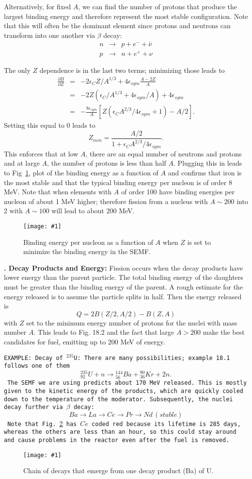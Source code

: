 \documentclass[11pt]{book}
\def\be{\begin{equation}}
\def\ee{\end{equation}}
\def\bea{\begin{eqnarray}}
\def\eea{\end{eqnarray}}
\newcommand{\vs}{\nonumber\\}
\newcommand{\sfig}[2]{
\texttt{[image: \#1]}
        }
\newcommand{\Sfig}[2]{
   \begin{figure}[thbp]
   \begin{center}
    \sfig{../Figures/#1.pdf}{0.7\columnwidth}
    \caption{{\small #2}}
    \label{fig:#1}
     \end{center}
   \end{figure}
}
\newcommand{\Spng}[2]{
   \begin{figure}[thbp]
   \begin{center}
    \sfig{../Figures/#1.png}{0.7\columnwidth}
    \caption{{\small #2}}
    \label{fig:#1}
     \end{center}
   \end{figure}
}
\newcommand{\rf}[1]{\ref{fig:#1}}
\newcommand\example[1]{{\tt EXAMPLE: #1}}
\newcommand\lecture[1]{\newpage
\addtocounter{lectureno}{1}
\setcounter{secno}{0}
\begin{center}
 {\bf Lecture \arabic{lectureno}: #1}
\end{center}
}
\newcounter{lectureno}
\newcounter{secno}
\newcommand\lsection[1]{
\addtocounter{secno}{1}
{\bf \arabic{lectureno}.\alph{secno} #1:}}
\begin{document}
Alternatively, for fixed $A$, we can find the number of protons that produce the largest binding energy and therefore represent the most stable configuration. Note that this will often be the dominant element since protons and neutrons can transform into one another via $\beta$ decay:
\bea
n &\rightarrow &p + e^- +\bar\nu
\vs
p &\rightarrow& n+ e^+ + \nu
\eea

The only $Z$ dependence is in the last two terms; minimizing those leads to
\bea
\frac{\partial B}{\partial Z}&=& -2\epsilon_C Z/A^{1/3} + 4\epsilon_{sym}\frac{A-2Z}{A}
\vs
&=&
-2Z\left( \epsilon_C/A^{1/3} + 4\epsilon_{sym}/A\right) + 4\epsilon_{sym}\vs
&=& -\frac{8\epsilon_{sym}}{A} \left[ Z\left( \epsilon_CA^{2/3}/4\epsilon_{sym} + 1\right) - A/2 \right].
\eea
Setting this equal to 0 leads to
\be
Z_{min} = \frac{A/2}{1+  \epsilon_CA^{2/3}/4\epsilon_{sym} }.\ee
This enforces that at low $A$, there are an equal number of neutrons and protons and at large $A$, the number of protons is less than half $A$. Plugging this in leads to Fig~\rf{bea}, plot of the binding energy as a function of $A$ and confirms that iron is the most stable and that the typical binding energy per nucleon is of order 8 MeV. Note that when elements with $A$ of order 100 have binding energies per nucleon of about 1 MeV higher; therefore fission from a nucleus with $A\sim200$ into 2 with $A\sim 100$ will lead to about 200 MeV.
\Spng{bea}{Binding energy per nucleon as a function of $A$ when $Z$ is set to minimize the binding energy in the SEMF.}




\lsection{Decay Products and Energy}
Fission occurs when the decay products have lower energy than the parent particle. The total binding energy of the daughters must be greater than the binding energy of the parent. A rough estimate for the energy released is to assume the particle splits in half. Then the energy released is
\be
Q = 2B(Z/2,A/2) - B(Z,A)
\ee
with $Z$ set to the minimum energy number of protons for the nuclei with mass number $A$. This leads to Fig. 18.2 and the fact that large $A>200$ make the best candidates for fuel, emitting up to 200 MeV of energy.

\example{Decay of $^{235}$U: There are many possibilities; example 18.1 follows one of them
\be
{}^{235}_{92}U + n\rightarrow {}^{144}_{56}Ba + {}^{90}_{36}Kr + 2n.\ee
The SEMF we are using predicts about 170 MeV released. This is mostly given to the kinetic energy of the products, which are quickly cooled down to the temperature of the moderator. Subsequently, the nuclei decay further via $\beta$ decay:
\be
Ba \rightarrow La \rightarrow Ce\rightarrow Pr \rightarrow Nd\, (stable)
\ee
Note that Fig.~\rf{bachain} has $Ce$ coded red because its lifetime is 285 days, whereas the others are less than an hour, so this could stay around and cause problems in the reactor even after the fuel is removed.
\Sfig{bachain}{Chain of decays that emerge from one decay product (Ba) of U.}}
\end{document}
